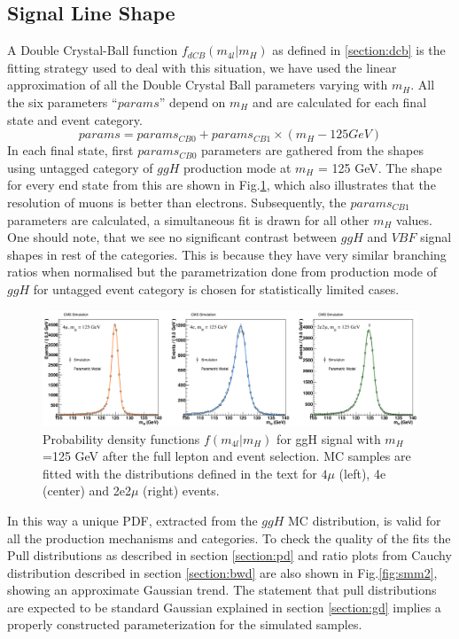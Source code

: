 \subsection{Signal Line Shape}
A Double Crystal-Ball function $f_{dCB} (m_{4l} | m_H )$ as defined in \ref{section:dcb} is the fitting strategy used to deal with this situation, we have used the linear approximation of all the Double Crystal Ball parameters varying with $m_H$. All the six parameters ``$params$'' depend on $m_H$ and are calculated for each final state and event category.
\begin{equation}
    params = params_{CB0} + params_{CB1} \times (m_H - 125 GeV)
\end{equation}
In each final state, first $params_{CB0}$ parameters are gathered from the shapes using untagged category of $ggH$ production mode at $m_H$ = 125 GeV. The shape for every end state from this are shown in Fig.\ref{fig:smm}, which also illustrates that the resolution of muons is better than electrons. Subsequently, the $params_{CB1}$ parameters are calculated, a simultaneous fit is drawn for all other $m_H$ values. One should note, that we see no significant contrast between $ggH$ and $VBF$ signal shapes in rest of the categories. This is because they have very similar branching ratios when normalised but the parametrization done from production mode of $ggH$ for untagged event category is chosen for statistically limited cases.
\begin{figure}
    \centering
    \includegraphics[scale=0.285]{images/sm.png}
    \caption{Probability density functions $f(m_{4l} |m_H)$ for ggH signal with $m_H$ =125 GeV after the full lepton and event selection. MC samples are fitted with the distributions defined in the text for $4\mu$ (left), 4e (center) and 2e2$\mu$ (right) events.}
    \label{fig:smm}
\end{figure}
In this way a unique PDF, extracted from the $ggH$ MC distribution, is valid for all the production mechanisms and categories. To check the quality of the
fits the Pull distributions as described in section \ref{section:pd} and ratio plots from Cauchy distribution described in section \ref{section:bwd} are also shown in Fig.\ref{fig:smm2}, showing an approximate Gaussian trend. The statement that pull distributions are expected to be standard Gaussian explained in section \ref{section:gd} implies a properly constructed parameterization for the simulated samples.\\
